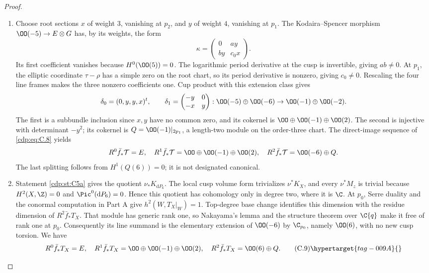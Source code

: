 \begin{proof}
\begin{enumerate}[label={$\langle1\rangle$\arabic*.},leftmargin=*]
\item Choose root sections $x$ of weight $3$, vanishing at $p_2$, and $y$ of weight $4$, vanishing at $p_1$. The Kodaira--Spencer morphism $\OO(-5)\to E\otimes G$ has, by its weights, the form
\[
 \kappa=\begin{pmatrix}0&a y\\b y&c_0x\end{pmatrix}.
\]
Its first coefficient vanishes because $H^0(\OO(5))=0$. The logarithmic period derivative at the cusp is invertible, giving $ab\ne0$. At $p_1$, the elliptic coordinate $\tau-\rho$ has a simple zero on the root chart, so its period derivative is nonzero, giving $c_0\ne0$. Rescaling the four line frames makes the three nonzero coefficients one. Cup product with this extension class gives
\[
\delta_0=(0,y,y,x)^t,\qquad
\delta_1=\begin{pmatrix}-y&0\\-x&y\end{pmatrix}:
 \OO(-5)\oplus\OO(-6)\to\OO(-1)\oplus\OO(-2).
\]
The first is a subbundle inclusion since $x,y$ have no common zero, and its cokernel is $\OO\oplus\OO(-1)\oplus\OO(2)$. The second is injective with determinant $-y^2$; its cokernel is
$Q=\OO(-1)|_{2p_1}$, a length-two module on the order-three chart. The direct-image sequence of \eqref{cdp:eq:C.8} yields
\[
 R^0\bar f_*\mathcal T=E,\quad
 R^1\bar f_*\mathcal T=\OO\oplus\OO(-1)\oplus\OO(2),\quad
 R^2\bar f_*\mathcal T=\OO(-6)\oplus Q.
\]
The last splitting follows from $H^1(Q(6))=0$; it is not designated canonical.

\item Statement \ref{cdp:st:C5a} gives the quotient $\nu_*K_{\mathrm dP_6}$. The local cusp volume form trivializes $\nu^*K_X$, and every $\nu^*M_z$ is trivial because $H^2(X,\Z)=0$ and $\Pic^0(\mathrm dP_6)=0$. Hence this quotient has cohomology only in degree two, where it is $\C$. At $p_0$, Serre duality and the conormal computation in Part A give $h^2(W,T_X|_W)=1$. Top-degree base change identifies this dimension with the residue dimension of $R^2\bar f_*T_X$. That module has generic rank one, so Nakayama's lemma and the structure theorem over $\C\{q\}$ make it free of rank one at $p_0$. Consequently its line summand is the elementary extension of $\OO(-6)$ by $\C_{p_0}$, namely $\OO(6)$, with no new cusp torsion. We have
\[
 R^0\bar f_*T_X=E,\quad
 R^1\bar f_*T_X=\OO\oplus\OO(-1)\oplus\OO(2),\quad
 R^2\bar f_*T_X=\OO(6)\oplus Q.                       \tag{C.9}\hypertarget{tag-009A}{}\label{cdp:eq:C.9}
\]


\end{enumerate}
\end{proof}
